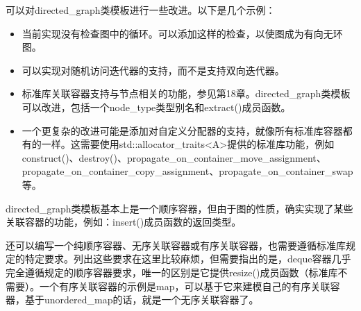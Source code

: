 
可以对directed\_graph类模板进行一些改进。以下是几个示例：

\begin{itemize}
\item
当前实现没有检查图中的循环。可以添加这样的检查，以使图成为有向无环图。

\item
可以实现对随机访问迭代器的支持，而不是支持双向迭代器。

\item
标准库关联容器支持与节点相关的功能，参见第18章。directed\_graph类模板可以改进，包括一个node\_type类型别名和extract()成员函数。

\item
一个更复杂的改进可能是添加对自定义分配器的支持，就像所有标准库容器都有的一样。这需要使用std::allocator\_traits<A>提供的标准库功能，例如construct()、destroy()、propagate\_on\_container\_move\_assignment、propagate\_on\_container\_copy\_assignment、propagate\_on\_container\_swap等。
\end{itemize}


directed\_graph类模板基本上是一个顺序容器，但由于图的性质，确实实现了某些关联容器的功能，例如：insert()成员函数的返回类型。

还可以编写一个纯顺序容器、无序关联容器或有序关联容器，也需要遵循标准库规定的特定要求。列出这些要求在这里比较麻烦，但需要指出的是，deque容器几乎完全遵循规定的顺序容器要求，唯一的区别是它提供resize()成员函数（标准库不需要）。一个有序关联容器的示例是map，可以基于它来建模自己的有序关联容器，基于unordered\_map的话，就是一个无序关联容器了。


